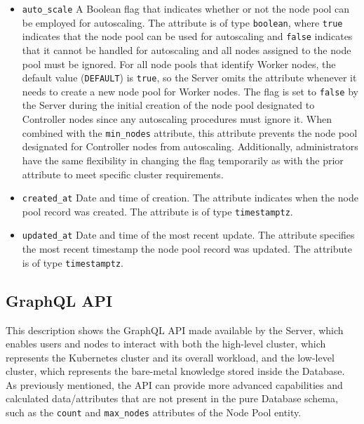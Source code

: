 \begin{itemize}
  \item \texttt{auto\_scale}
    \newline
    A Boolean flag that indicates whether or not the node pool can be employed
    for autoscaling.
    \newline
    The attribute is of type \texttt{boolean}, where \texttt{true} indicates
    that the node pool can be used for autoscaling and \texttt{false} indicates that
    it cannot be handled for autoscaling and all nodes assigned to the node pool
    must be ignored.
    \newline
    For all node pools that identify Worker nodes, the default value (\texttt{DEFAULT})
    is \texttt{true}, so the Server omits the attribute whenever it needs to
    create a new node pool for Worker nodes. The flag is set to \texttt{false}
    by the Server during the initial creation of the node pool designated to
    Controller nodes since any autoscaling procedures must ignore it.
    \newline
    When combined with the \texttt{min\_nodes} attribute, this attribute prevents
    the node pool designated for Controller nodes from autoscaling. Additionally,
    administrators have the same flexibility in changing the flag temporarily as
    with the prior attribute to meet specific cluster requirements.

  \item \texttt{created\_at}
    \newline
    Date and time of creation.
    \newline
    The attribute indicates when the node pool record was created.
    \newline
    The attribute is of type \texttt{timestamptz}.

  \item \texttt{updated\_at}
    \newline
    Date and time of the most recent update.
    \newline
    The attribute specifies the most recent timestamp the node pool record was updated.
    \newline
    The attribute is of type \texttt{timestamptz}.
\end{itemize}

\subsection{GraphQL API}
\label{subsec:implementation_server_graphql_api}

This description shows the GraphQL API made available by the Server, which enables
users and nodes to interact with both the high-level cluster, which represents
the Kubernetes cluster and its overall workload, and the low-level cluster,
which represents the bare-metal knowledge stored inside the Database. As previously
mentioned, the API can provide more advanced capabilities and calculated data/attributes
that are not present in the pure Database schema, such as the \texttt{count} and
\texttt{max\_nodes} attributes of the Node Pool entity.

